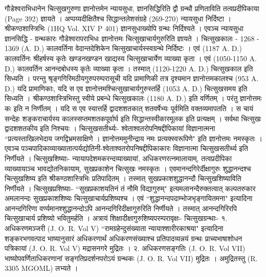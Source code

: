 गौडेश्वराभिधानेन चित्सुखगुरुणा ज्ञानोत्तमेन न्यायसुधा, ज्ञानसिद्धिरिति द्वौ ग्रन्थौ प्रणिताविति तत्वप्रदीपिकाया (Page 392) ज्ञायते । अप्पय्यदीक्षितैश्च सिद्धान्तलेशसंग्रहे (269-270) न्यायसुधा निर्दिष्टा । श्रीकण्ठशास्त्रिभिः (1HQ Vol. XIV P 401) ज्ञानसुधाख्योपि ग्रन्थः निर्दिश्यते । एवञ्च न्यायसुधा ज्ञानसिद्धि - ग्रन्थकारः गौडेश्वरापराभिधः ज्ञानोत्तमः चित्सुखाचार्यगुरुरिति ज्ञायते ।
चित्सुखकालः -
1268 - 1369 (A. D.) कालवर्तिना वेदान्तदेशिकेन चित्सुखाचार्यस्स्वग्रन्थे निर्दिष्टः । एवं (1187 A. D.) कालवर्तिनः श्रीहर्षस्य कृतेः खण्डनखण्डन खाद्यस्य चित्सुखाचार्येण व्याख्या कृता । एवं (1050-1150 A. D.) कालवर्तिन आनन्दबोधस्य कृतेः व्याख्या कृता । तस्मात् (1120-1220 A. D.) चित्सुखकाल इति सिध्यति ।
परन्तु श्रृङ्गगिरिमठीयगुरुपरम्परासूची यदि प्रामाणिकी तत्र दृश्यमान ज्ञानोत्तमकालश्च (953 A. D.) यदि प्रामाणिकाः, यदि स एव ज्ञानोत्तमश्चित्सुखाचार्यगुरुस्तर्हि (1053 A. D.) चित्सुखसमय इति सिध्यति । श्रीकण्ठशास्त्रिभिस्तु स्वीये प्रबन्धे चित्सुखकालः (1180 A. D.) इति वर्णितम् । परंतु ज्ञानोत्तमः कः इति न निर्णीतम् । यदि स एव स्यात्तर्हि द्वादशशतकात् शतवर्षेभ्यः पूर्वमिति वक्तव्यमापतति । स चायं सन्देहः शङ्कराचार्यस्य कालस्सप्तमशतकपूर्वार्घ इति सिद्धान्तस्वीकारमूलक इति प्रत्यक्षम् । सर्वथा चित्सुखः द्वादशशतकीय इति निश्चयः । 
चित्सुखसतीर्थ्यः-
श्वेताश्वतरोपनिषद्दीपिकायां विज्ञानात्मना ``प्रत्यस्ताखिलभेदाय जगद्विभ्रमसाक्षिणे । ज्ञानोत्तममुनीन्द्राय नमः प्रत्यक्स्वरूपिणे" इति ज्ञानोत्तमः नमस्कृतः । एवञ्च पञ्चपादिकाव्याख्यातात्पर्यद्योतिनी-श्वेताश्वतरोपनिषद्दीपिकाकारः विज्ञानात्मा चित्सुखसतीर्थ्य इति निर्णीयते ।
चित्सुखशिष्याः-
न्यायापदेशमकरन्दव्याख्यायां, अधिकरणरत्नमालायाम्, तत्वप्रदीपिका व्याख्यायाञ्च भावद्योतनिकायाम्, सुखप्रकाशेन चित्सुखः नमस्कृतः । एवमानन्दगिरेर्दीक्षागुरुः शुद्धानन्दश्च चित्सुखशिष्य इति श्रीकण्ठशास्त्रिभिः प्रतिपादितम् । तस्मात् सुखप्रकाशशुद्धानन्दौ चित्सुखशिष्याविति निर्णीयते ।
चित्सुखप्रशिष्याः-
``सुखप्रकाशयतिनं तं नौमि विद्यागुरुम्" इत्यमलानन्दैरुक्तत्वात् कल्पतरुकार अमलानन्दः सुखप्रकाशशिष्यः चित्सुखाचार्यप्रशिष्यश्च । एवं ``शुद्धानन्दपदाम्भोजभृङ्गायितमना" इत्यादिना आनन्दगिरिणा वर्ण्यमानश्शुद्धानन्दोऽपि आनन्दगिरिदीक्षागुरुरिति निर्णीयते । तस्मात् आनन्दगिरिरपि चित्सुखाचार्य प्रशिष्यो भवितुमर्हति ।
अत्रायं शिक्षादीक्षागुरुशिष्यपरम्परावृक्षः-
चित्सुखग्रन्थाः-
१. अधिकरणमञ्जरी (J. O. R. Vol V)
``रामग्रहेन्दुसंख्याता न्यायाश्शारीरकाश्रया" इत्यादिना शङ्करभगवत्पाद भाष्यानुसारं अधिकरणार्थं अधिकरणसंख्याश्च प्रतिपादव्यन्नयं ग्रन्थः प्राच्यभाषाशोधन पत्रिकायां (J. O. R. Vol V) मद्रासनगरे मुद्रितः ।
२. अधिकरणसङ्गतिः (J. O. R. Vol VII)
भाष्योपवर्णिताधिकरणानां सङ्गतिप्रदर्शनपरोऽयं ग्रन्थकः (J. O. R. Vol VII) मुद्रितः । अमुद्रितस्तु (R. 3305 MGOML) लभ्यते ।
